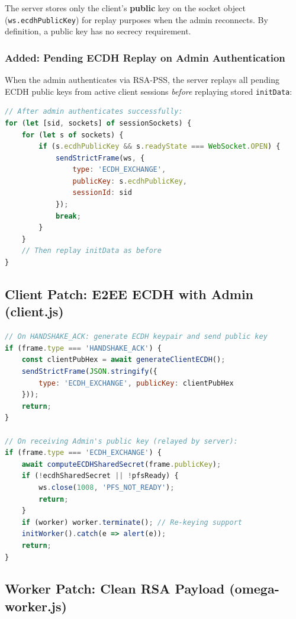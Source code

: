 \documentclass[12pt,a4paper]{article}
\begin{document}
The server stores only the client's \textbf{public} key on the socket object (\texttt{ws.ecdhPublicKey}) for replay purposes when the admin reconnects. By definition, a public key has no secrecy requirement.

\subsubsection{Added: Pending ECDH Replay on Admin Authentication}

When the admin authenticates via RSA-PSS, the server replays all pending ECDH public keys from active client sessions \textit{before} replaying stored \texttt{initData}:

\begin{lstlisting}[language=JavaScript, caption=ECDH replay on admin auth (server.js --- PATCHED)]
// After admin authenticates successfully:
for (let [sid, sockets] of sessionSockets) {
    for (let s of sockets) {
        if (s.ecdhPublicKey && s.readyState === WebSocket.OPEN) {
            sendStrictFrame(ws, {
                type: 'ECDH_EXCHANGE',
                publicKey: s.ecdhPublicKey,
                sessionId: sid
            });
            break;
        }
    }
    // Then replay initData as before
}
\end{lstlisting}

\subsection{Client Patch: E2EE ECDH with Admin (client.js)}

\begin{lstlisting}[language=JavaScript, caption=Client E2EE ECDH (client.js --- PATCHED)]
// On HANDSHAKE_ACK: generate ECDH keypair and send public key
if (frame.type === 'HANDSHAKE_ACK') {
    const clientPubHex = await generateClientECDH();
    sendStrictFrame(JSON.stringify({
        type: 'ECDH_EXCHANGE', publicKey: clientPubHex
    }));
    return;
}

// On receiving Admin's public key (relayed by server):
if (frame.type === 'ECDH_EXCHANGE') {
    await computeECDHSharedSecret(frame.publicKey);
    if (!ecdhSharedSecret || !pfsReady) {
        ws.close(1008, 'PFS_NOT_READY');
        return;
    }
    if (worker) worker.terminate(); // Re-keying support
    initWorker().catch(e => alert(e));
    return;
}
\end{lstlisting}

\subsection{Worker Patch: Clean RSA Payload (omega-worker.js)}
\end{document}
